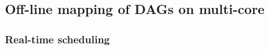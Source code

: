 \documentclass[main.tex]{subfiles}
\begin{document}






\subsection{Off-line mapping of DAGs on multi-core}


\subsubsection{Real-time scheduling}
\end{document}

